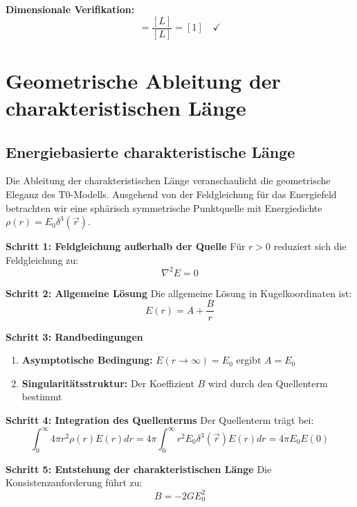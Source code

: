 \documentclass[12pt,a4paper]{report}
\begin{document}
\textbf{Dimensionale Verifikation:}
\begin{equation}
	[\xi] = \frac{[L]}{[L]} = [1] \quad \checkmark
\end{equation}

	\section{Geometrische Ableitung der charakteristischen Länge}\label{sec:geometric_derivation}
	
	\subsection{Energiebasierte charakteristische Länge}\label{subsec:energy_based_length}
	
	Die Ableitung der charakteristischen Länge veranschaulicht die geometrische Eleganz des T0-Modells. Ausgehend von der Feldgleichung für das Energiefeld betrachten wir eine sphärisch symmetrische Punktquelle mit Energiedichte $\rho(r) = E_0 \delta^3(\vec{r})$.
	
	\textbf{Schritt 1: Feldgleichung außerhalb der Quelle}
	Für $r > 0$ reduziert sich die Feldgleichung zu:
	\begin{equation}
		\nabla^2 E = 0
		\label{eq:laplace_outside}
	\end{equation}
	
	\textbf{Schritt 2: Allgemeine Lösung}
	Die allgemeine Lösung in Kugelkoordinaten ist:
	\begin{equation}
		E(r) = A + \frac{B}{r}
		\label{eq:general_solution}
	\end{equation}
	
	\textbf{Schritt 3: Randbedingungen}
	\begin{enumerate}
		\item \textbf{Asymptotische Bedingung:} $E(r \to \infty) = E_0$ ergibt $A = E_0$
		\item \textbf{Singularitätsstruktur:} Der Koeffizient $B$ wird durch den Quellenterm bestimmt
	\end{enumerate}
	
	\textbf{Schritt 4: Integration des Quellenterms}
	Der Quellenterm trägt bei:
	\begin{equation}
		\int_0^{\infty} 4\pi r^2 \rho(r) E(r) dr = 4\pi \int_0^{\infty} r^2 E_0 \delta^3(\vec{r}) E(r) dr = 4\pi E_0 E(0)
	\end{equation}
	
	\textbf{Schritt 5: Entstehung der charakteristischen Länge}
	Die Konsistenzanforderung führt zu:
	\begin{equation}
		B = -2GE_0^2
	\end{equation}
	
\end{document}
